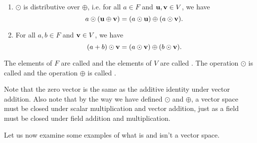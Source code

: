 \begin{defn}
\begin{enumerate}
    \item $ \odot $ is distributive over $ \oplus $, i.e. for all $ a\in F $ and $ \boldsymbol{\mathbf{u}},\boldsymbol{\mathbf{v}}\in V $, we have
    \begin{equation*}
        a\odot(\boldsymbol{\mathbf{u}}\oplus\boldsymbol{\mathbf{v}})=(a\odot\boldsymbol{\mathbf{u}})\oplus(a\odot\boldsymbol{\mathbf{v}}).
    \end{equation*}

    \item For all $ a,b\in F $ and $ \boldsymbol{\mathbf{v}}\in V $, we have
    \begin{equation*}
        (a+b)\odot\boldsymbol{\mathbf{v}}=(a\odot\boldsymbol{\mathbf{v}})\oplus(b\odot\boldsymbol{\mathbf{v}}).
    \end{equation*}
\end{enumerate}

The elements of $ F $ are called  and the elements of $ V $ are called . The operation $ \odot $ is called  and the operation $ \oplus $ is called .
\end{defn}

Note that the zero vector is the same as the additive identity under vector addition. Also note that by the way we have defined $ \odot $ and $ \oplus $, a vector space must be closed under scalar multiplication and vector addition, just as a field must be closed under field addition and multiplication.

Let us now examine some examples of what is and isn't a vector space.

